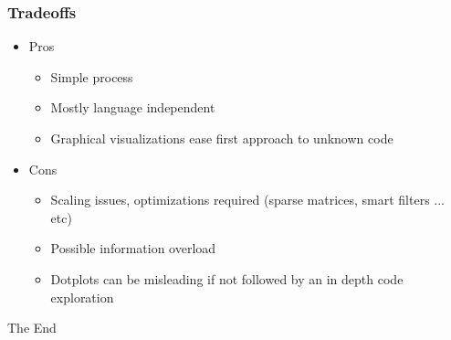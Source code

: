 \documentclass{beamer}
\begin{document}
\begin{frame}
\frametitle{Tradeoffs}
  \begin{itemize}
    \item Pros
      \begin{itemize}
        \item Simple process
        \item Mostly language independent
        \item Graphical visualizations ease first approach to unknown code
      \end{itemize}
    \item Cons
      \begin{itemize}
        \item Scaling issues, optimizations required (sparse matrices, smart filters ... etc)
        \item Possible information overload
        \item Dotplots can be misleading if not followed by an in depth code exploration
      \end{itemize}
  \end{itemize}
\end{frame}

\begin{frame}
\centering
\Huge
The End
\end{frame}
\end{document}
